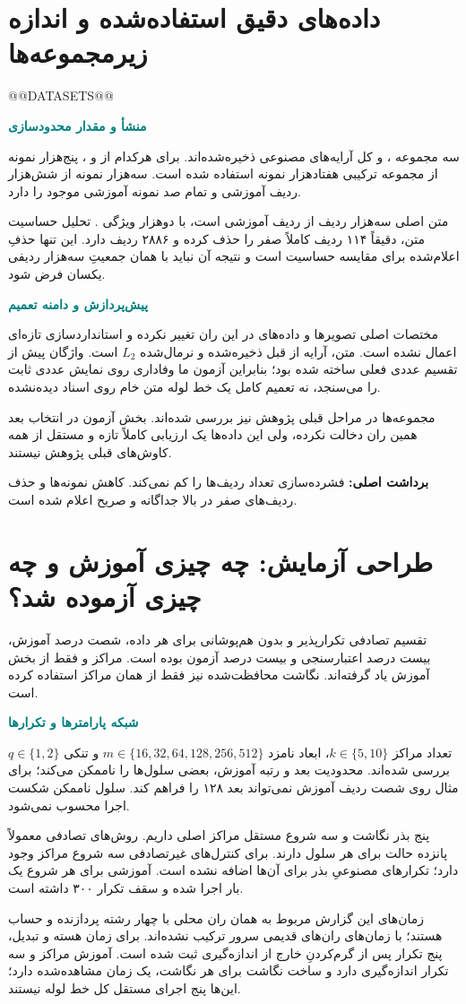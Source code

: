 \documentclass[11pt,a4paper]{article}
\newcommand{\lesson}[1]{\clearpage\section{#1}}
\newcommand{\key}[1]{\par\vspace{4pt}\noindent\colorbox{pale}{\parbox{\dimexpr\textwidth-2\fboxsep\relax}{\textbf{برداشت اصلی:} #1}}\par\vspace{3pt}}
\newcommand{\sub}[1]{\par\vspace{3pt}\textbf{\textcolor{teal}{#1}}\par}
\begin{document}
\lesson{داده‌های دقیق استفاده‌شده و اندازه زیرمجموعه‌ها}
@@DATASETS@@
\sub{منشأ و مقدار محدودسازی}
سه مجموعه ،  و  کل آرایه‌های مصنوعی ذخیره‌شده‌اند. برای هرکدام از  و ، پنج‌هزار نمونه از مجموعه ترکیبی هفتادهزار نمونه استفاده شده است.  سه‌هزار نمونه از شش‌هزار ردیف آموزشی و  تمام صد نمونه آموزشی موجود را دارد.

متن اصلی سه‌هزار ردیف از  ردیف آموزشی  است، با دو‌هزار ویژگی . تحلیل حساسیت متن، دقیقاً ۱۱۴ ردیف کاملاً صفر را حذف کرده و ۲۸۸۶ ردیف دارد. این تنها حذفِ اعلام‌شده برای مقایسه حساسیت است و نتیجه آن نباید با همان جمعیتِ سه‌هزار ردیفی یکسان فرض شود.

\sub{پیش‌پردازش و دامنه تعمیم}
مختصات اصلی تصویرها و داده‌های  در این ران تغییر نکرده و استانداردسازی تازه‌ای اعمال نشده است. متن، آرایه از قبل ذخیره‌شده و نرمال‌شده \(L_2\) است. واژگان  پیش از تقسیم عددی فعلی ساخته شده بود؛ بنابراین آزمون ما وفاداری روی نمایش عددی ثابت را می‌سنجد، نه تعمیم کامل یک خط لوله متن خام روی اسناد دیده‌نشده.

مجموعه‌ها در مراحل قبلی پژوهش نیز بررسی شده‌اند. بخش آزمون در انتخاب بعد همین ران دخالت نکرده، ولی این داده‌ها یک ارزیابی کاملاً تازه و مستقل از همه کاوش‌های قبلی پژوهش نیستند.
\key{فشرده‌سازی تعداد ردیف‌ها را کم نمی‌کند. کاهش نمونه‌ها و حذف ردیف‌های صفر در بالا جداگانه و صریح اعلام شده است.}

\lesson{طراحی آزمایش: چه چیزی آموزش و چه چیزی آزموده شد؟}
تقسیم تصادفی تکرارپذیر و بدون هم‌پوشانی برای هر داده، شصت درصد آموزش، بیست درصد اعتبارسنجی و بیست درصد آزمون بوده است. مراکز و  فقط از بخش آموزش یاد گرفته‌اند. نگاشت محافظت‌شده نیز فقط از همان مراکز استفاده کرده است.

\sub{شبکه پارامترها و تکرارها}
تعداد مراکز \(k\in\{5,10\}\)، ابعاد نامزد \(m\in\{16,32,64,128,256,512\}\) و تنکی \(q\in\{1,2\}\) بررسی شده‌اند. محدودیت بعد و رتبه آموزش، بعضی سلول‌ها را ناممکن می‌کند؛ برای مثال  روی شصت ردیف آموزش  نمی‌تواند بعد ۱۲۸ را فراهم کند. سلول ناممکن شکست اجرا محسوب نمی‌شود.

پنج بذر نگاشت و سه شروع مستقل مراکز اصلی داریم. روش‌های تصادفی معمولاً پانزده حالت برای هر سلول دارند. برای کنترل‌های غیرتصادفی سه شروع مراکز وجود دارد؛ تکرارهای مصنوعیِ بذر برای آن‌ها اضافه نشده است.  آموزشی برای هر شروع یک بار اجرا شده و سقف تکرار ۳۰۰ داشته است.

زمان‌های این گزارش مربوط به همان ران محلی با چهار رشته پردازنده و حساب  هستند؛ با زمان‌های ران‌های قدیمی سرور ترکیب نشده‌اند. برای زمان هسته و تبدیل، پنج تکرار پس از گرم‌کردنِ خارج از اندازه‌گیری ثبت شده است. آموزش مراکز و  سه تکرار اندازه‌گیری دارد و ساخت نگاشت برای هر نگاشت، یک زمان مشاهده‌شده دارد؛ این‌ها پنج اجرای مستقل کل خط لوله نیستند.
\end{document}
